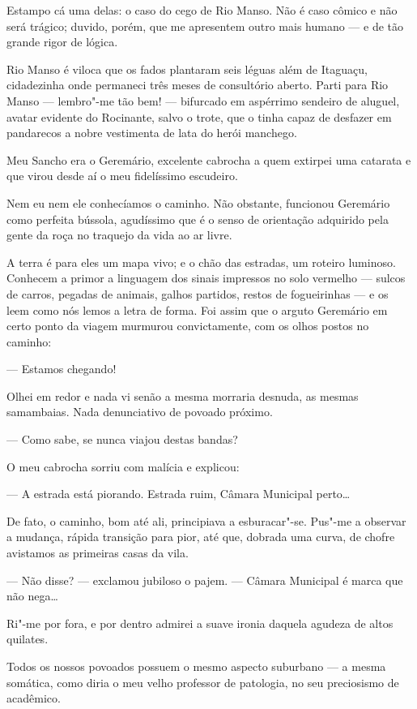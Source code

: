 Estampo cá uma delas: o caso do cego de Rio Manso. Não é caso cômico e
não será trágico; duvido, porém, que me apresentem outro mais humano ---
e de tão grande rigor de lógica.

Rio Manso é viloca que os fados plantaram seis léguas além de Itaguaçu,
cidadezinha onde permaneci três meses de consultório aberto. Parti para
Rio Manso --- lembro"-me tão bem! --- bifurcado em aspérrimo sendeiro de
aluguel, avatar evidente do Rocinante, salvo o trote, que o tinha capaz
de desfazer em pandarecos a nobre vestimenta de lata do herói manchego.

Meu Sancho era o Geremário, excelente cabrocha a quem extirpei uma
catarata e que virou desde aí o meu fidelíssimo escudeiro.

Nem eu nem ele conhecíamos o caminho. Não obstante, funcionou Geremário
como perfeita bússola, agudíssimo que é o senso de orientação adquirido
pela gente da roça no traquejo da vida ao ar livre.

A terra é para eles um mapa vivo; e o chão das estradas, um roteiro
luminoso. Conhecem a primor a linguagem dos sinais impressos no solo
vermelho --- sulcos de carros, pegadas de animais, galhos partidos,
restos de fogueirinhas --- e os leem como nós lemos a letra de forma.
Foi assim que o arguto Geremário em certo ponto da viagem murmurou
convictamente, com os olhos postos no caminho:

--- Estamos chegando!

Olhei em redor e nada vi senão a mesma morraria desnuda, as mesmas
samambaias. Nada denunciativo de povoado próximo.

--- Como sabe, se nunca viajou destas bandas?

O meu cabrocha sorriu com malícia e explicou:

--- A estrada está piorando. Estrada ruim, Câmara Municipal perto\ldots{}

De fato, o caminho, bom até ali, principiava a esburacar"-se. Pus"-me a
observar a mudança, rápida transição para pior, até que, dobrada uma
curva, de chofre avistamos as primeiras casas da vila.

--- Não disse? --- exclamou jubiloso o pajem. --- Câmara Municipal é
marca que não nega\ldots{}

Ri"-me por fora, e por dentro admirei a suave ironia daquela agudeza de
altos quilates.

Todos os nossos povoados possuem o mesmo aspecto suburbano --- a mesma
somática, como diria o meu velho professor de patologia, no seu
preciosismo de acadêmico.

